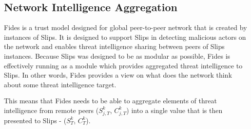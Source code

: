 \subsection{Network Intelligence Aggregation}
Fides is a trust model designed for global peer-to-peer network that is created by instances of Slips.
It is designed to support Slips in detecting malicious actors on the network and enables threat intelligence sharing between peers of Slips instances.
Because Slips was designed to be as modular as possible, Fides is effectively running as a module which provides aggregated threat intelligence to Slips. 
In other words, Fides provides a view on what does the network think about some threat intelligence target.

This means that Fides needs to be able to aggregate elements of threat intelligence from remote peers ($S^{k}_{j, T}$, $C^{k}_{j, T}$) into a single value that is then presented to Slips - ($S^{k}_{T}$, $C^{k}_{T}$).

